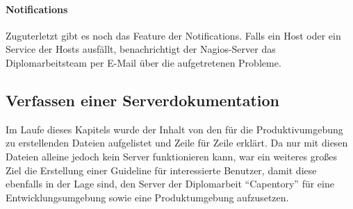 \hypertarget{notifications}{%
\paragraph{Notifications}\label{notifications}}

Zuguterletzt gibt es noch das Feature der Notifications. Falls ein Host
oder ein Service der Hosts ausfällt, benachrichtigt der Nagios-Server
das Diplomarbeitsteam per E-Mail über die aufgetretenen Probleme.

\hypertarget{verfassen-einer-serverdokumentation}{%
\subsection{Verfassen einer
Serverdokumentation}\label{verfassen-einer-serverdokumentation}}

Im Laufe dieses Kapitels wurde der Inhalt von den für die
Produktivumgebung zu erstellenden Dateien aufgelistet und Zeile für
Zeile erklärt. Da nur mit diesen Dateien alleine jedoch kein Server
funktionieren kann, war ein weiteres großes Ziel die Erstellung einer
Guideline für interessierte Benutzer, damit diese ebenfalls in der Lage
sind, den Server der Diplomarbeit ``Capentory'' für eine
Entwicklungsumgebung sowie eine Produktumgebung aufzusetzen.
